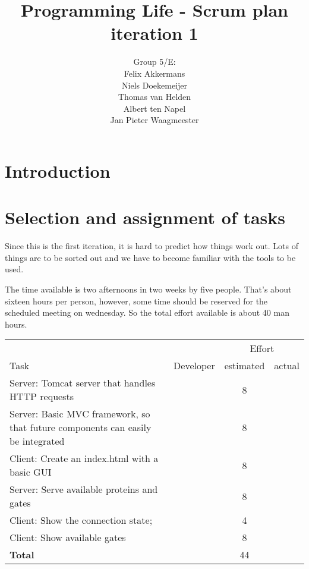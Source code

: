 \documentclass[a4paper]{article}
\title{Programming Life - Scrum plan iteration 1}
\author{Group 5/E:\\
Felix Akkermans \\
Niels Doekemeijer \\
Thomas van Helden \\
Albert ten Napel \\
Jan Pieter Waagmeester}
\begin{document}
\maketitle

\section{Introduction}

\section{Selection and assignment of tasks}
Since this is the first iteration, it is hard to predict how things work out. Lots of things are to be sorted out and we have to become familiar with the tools to be used.

The time available is two afternoons in two weeks by five people. That's about sixteen hours per person, however, some time should be reserved for the scheduled meeting on wednesday. So the total effort available is about 40 man hours.

\begin{table}[h!]
	

\begin{tabularx}{\textwidth}{p{9cm} l cc}
	& & \multicolumn{2}{c}{Effort} \\	
Task & Developer & estimated & actual \\
\hline
Server: Tomcat server that handles HTTP requests &
 & 8 & \\
 
Server: Basic MVC framework, so that future components can easily be integrated &
 & 8 & \\
 
Client: Create an index.html with a basic GUI &
 & 8 & \\
 
Server: Serve available proteins and gates &
 & 8 & \\
 
Client: Show the connection state; &
 & 4 & \\
 
Client: Show available gates &
 & 8 & \\ \hline

\textbf{Total} &
 & 44 & 
\end{tabularx}
\end{table}
\end{document}
